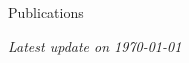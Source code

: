 \documentclass{resume} %
\begin{document}
\begin{rSection}{Publications}
\end{rSection}


\vfill

{\em Latest update on \today} 
\end{document}
